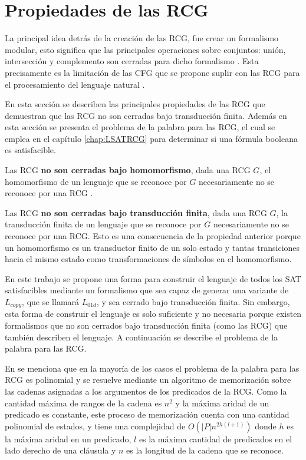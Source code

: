 \section{Propiedades de las RCG}

La principal idea detrás de la creación de las RCG, fue crear un formalismo modular, esto significa que las principales
operaciones sobre conjuntos: unión, intersección y complemento son cerradas para dicho formalismo \cite{mainRCGBib}. 
Esta precisamente es la limitación de las CFG que se propone suplir con las RCG para el procesamiento del lenguaje
natural \cite{mainRCGBib}. 

En esta sección se describen las principales propiedades de las RCG que demuestran que las RCG no son cerradas 
bajo transducción finita. Además en esta sección se presenta el problema de la palabra 
para las RCG, el cual se emplea en el capítulo \ref{chap:LSATRCG} para determinar si una fórmula booleana es satisfacible.

Las RCG \textbf{no son cerradas bajo homomorfismo}, dada una RCG $G$, el homomorfismo de un lenguaje que se reconoce por $G$ necesariamente no se reconoce por una RCG \cite{propertiesRCGBib}.

Las RCG \textbf{no son cerradas bajo transducción finita}, dada una RCG $G$, la transducción finita de un lenguaje que se reconoce por $G$ necesariamente no se reconoce por una RCG. Esto es una consecuencia de la propiedad anterior porque un homomorfismo es un transductor finito de un solo estado y tantas transiciones hacia el mismo estado como transformaciones de símbolos en el homomorfismo.

En este trabajo se propone una forma para construir el lenguaje de todos los SAT satisfacibles mediante un formalismo que sea capaz de generar una variante de $L_{copy}$, que se llamará $L_{01d}$, y sea cerrado bajo transducción finita. Sin embargo, esta forma de construir el lenguaje es solo suficiente y no necesaria porque existen formalismos que no son cerrados bajo transducción finita (como las RCG) que también describen el lenguaje.
A continuación se describe el problema de la palabra para las RCG.


En \cite{mainRCGBib} se menciona que en la mayoría de los casos el problema de la palabra para las RCG es polinomial y se resuelve mediante un algoritmo de memorización sobre las cadenas asignadas a los argumentos de los predicados de la RCG.  Como la cantidad máxima de rangos de la cadena es $n^2$ y la máxima aridad de un predicado es constante, este proceso de memorización cuenta con una cantidad polinomial de estados, y tiene una complejidad de $O(|P|n^{2h(l+1)})$ donde $h$ es la máxima aridad en un predicado, $l$ es la máxima cantidad de predicados en el lado derecho de una cláusula y $n$ es la longitud de la cadena que se reconoce.

